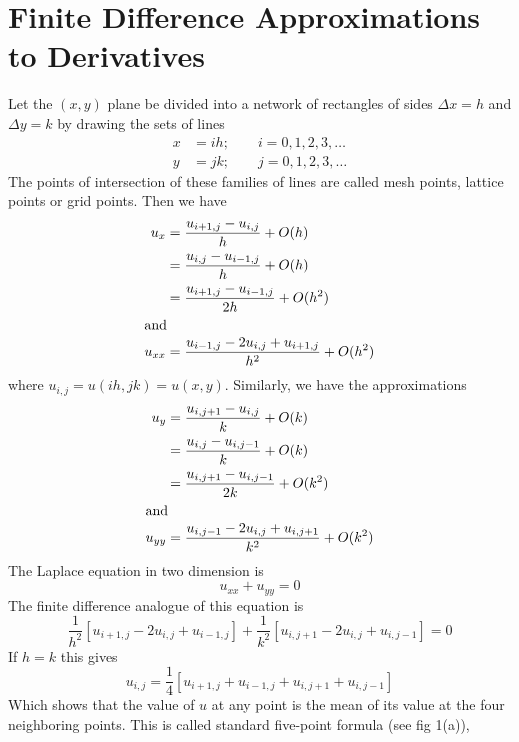 \documentclass[../main-sheet.tex]{subfiles}
\begin{document}
\section{Finite Difference Approximations to Derivatives}
Let the \((x,y)\) plane be divided into a network of rectangles of sides \(\Delta x=h\) and \(\Delta y=k\) by drawing the sets of lines
\begin{align*}
    x&=ih;\qquad i=0,1,2,3,\dots\\
    y&=jk;\qquad j=0,1,2,3,\dots
\end{align*}
The points of intersection of these families of lines are called mesh points, lattice points or grid points. Then we have
\begin{align}
    u_x&=\frac{u_{i+1,j}-u_{i,j}}{h}+O(h)\label{eq:pde6}\\
    &=\frac{u_{i,j}-u_{i-1,j}}{h}+O(h)\label{eq:pde7}\\
    &=\frac{u_{i+1,j}-u_{i-1,j}}{2h}+O(h^2)\label{eq:pde8}\\
    \intertext{and }
    u_{xx}&=\frac{u_{i-1,j}-2u_{i,j}+u_{i+1,j}}{h^2}+O(h^2)\label{eq:pde9}
\end{align}
where \(u_{i,j}=u(ih,jk)=u(x,y)\). Similarly, we have the approximations
\begin{align}
    u_y&=\frac{u_{i,j+1}-u_{i,j}}{k}+O(k)\label{eq:pde10}\\
    &=\frac{u_{i,j}-u_{i,j-1}}{k}+O(k)\label{eq:pde11}\\
    &=\frac{u_{i,j+1}-u_{i,j-1}}{2k}+O(k^2)\label{eq:pde12}\\
    \intertext{and }
    u_{yy}&=\frac{u_{i,j-1}-2u_{i,j}+u_{i,j+1}}{k^2}+O(k^2)\label{eq:pde13}
\end{align}
The Laplace equation in two dimension is 
\[u_{xx}+u_{yy}=0\]
The finite difference analogue of this equation is
\begin{equation}
    \frac{1}{h^2}[u_{i+1,j}-2u_{i,j}+u_{i-1,j}]+\frac{1}{k^2}[u_{i,j+1}-2u_{i,j}+u_{i,j-1}]=0\label{eq:pde14}
\end{equation}
If \(h=k\) this gives
\begin{equation}
    u_{i,j}=\frac{1}{4}[u_{i+1,j}+u_{i-1,j}+u_{i,j+1}+u_{i,j-1}]\label{eq:pde15}
\end{equation}
Which shows that the value of \(u\) at any point is the mean of its value at the four neighboring points. This is called standard five-point formula (see fig 1(a)),
\end{document}

